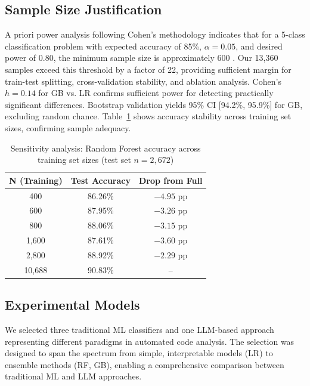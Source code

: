 \documentclass[10pt,letterpaper]{article}
\begin{document}
\subsection{Sample Size Justification}

A priori power analysis following Cohen's methodology \cite{cohen1988statistical} indicates that for a 5-class classification problem with expected accuracy of 85\%, $\alpha = 0.05$, and desired power of 0.80, the minimum sample size is approximately 600 \cite{lachenbruch1998power}. Our 13,360 samples exceed this threshold by a factor of 22, providing sufficient margin for train-test splitting, cross-validation stability, and ablation analysis. Cohen's $h = 0.14$ for GB vs. LR confirms sufficient power for detecting practically significant differences. Bootstrap validation yields 95\% CI [94.2\%, 95.9\%] for GB, excluding random chance. Table~\ref{tab:sensitivity} shows accuracy stability across training set sizes, confirming sample adequacy.

\begin{table}[htbp]
\centering
\caption{Sensitivity analysis: Random Forest accuracy across training set sizes (test set $n=2{,}672$)}
\label{tab:sensitivity}
\begin{tabular}{@{}ccc@{}}
\toprule
N (Training) & Test Accuracy & Drop from Full \\
\midrule
400   & 86.26\% & $-4.95$ pp \\
600   & 87.95\% & $-3.26$ pp \\
800   & 88.06\% & $-3.15$ pp \\
1,600 & 87.61\% & $-3.60$ pp \\
2,800 & 88.92\% & $-2.29$ pp \\
10,688 & 90.83\% & -- \\
\bottomrule
\end{tabular}
\end{table}

\subsection{Experimental Models}

We selected three traditional ML classifiers and one LLM-based approach
representing different paradigms in automated code analysis. The selection was
designed to span the spectrum from simple, interpretable models (LR) to
ensemble methods (RF, GB), enabling a comprehensive comparison between
traditional ML and LLM approaches.
\end{document}

